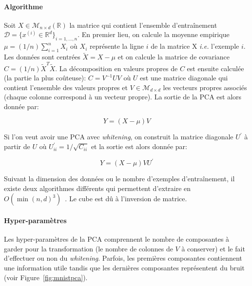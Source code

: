 \paragraph{Algorithme} Soit $X\in\mathcal{M}_{n\times d}(\mathbb{R})$ la
matrice qui contient l'ensemble d'entraînement $\mathcal{D}=\lbrace
x^{(i)}\in\mathbb{R}^d \rbrace_{i=1,\dots,n}$.  En premier lieu, on calcule la
moyenne empirique $\mu=(1/n)\sum_{i=1}^{n}X_i$ où $X_i$ représente la ligne $i$
de la matrice X \textit{i.e.} l'exemple $i$. Les données sont centrées
$\tilde{X}=X-\mu$ et on calcule la matrice de covariance
$C=(1/n)\tilde{X}^T\tilde{X}$. La décomposition en valeurs propres de $C$ est
ensuite calculée (la partie la plus co\^uteuse): $C=V^{-1}UV$ où
$U$ est une matrice diagonale qui contient l'ensemble des valeurs propres
et $V\in\mathcal{M}_{d\times d}$ les vecteurs propres associés (chaque colonne
correspond à un vecteur propre). La sortie de la PCA est alors donnée par:

\begin{equation}
Y=(X-\mu)V
\end{equation}

Si l'on veut avoir une PCA avec \textit{whitening}, on construit la matrice
diagonale $U^{'}$ à partir de $U$ où $U^{'}_{ii}=1/\sqrt{C_{ii}}$ et la sortie
est alors donnée par:

\begin{equation}
Y=(X-\mu)VU^{'}
\end{equation}


Suivant la dimension des données ou le nombre d'exemples d'entraînement, il
existe deux algorithmes différents qui permettent d'extraire en
$O(\min(n,d)^3)$~\cite{bishop-book2006}.  Le cube est dû à l'inversion de
matrice.

\paragraph{Hyper-paramètres} Les hyper-paramètres de la PCA comprennent le
nombre de composantes à garder pour la transformation (le nombre de colonnes de
$V$ à conserver) et le fait d'effectuer ou non du \textit{whitening}. Parfois,
les premières composantes contiennent une information utile tandis que les
dernières composantes représentent du bruit (voir Figure~\ref{fig:mnistpca}).


